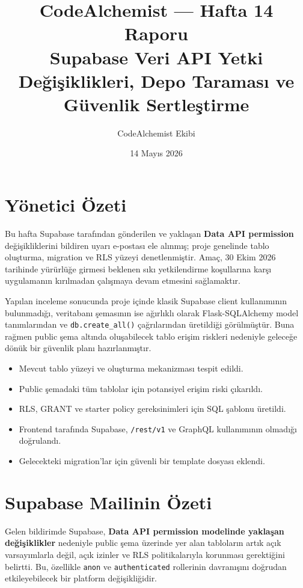 \documentclass[12pt,a4paper]{article}
\title{\textbf{CodeAlchemist --- Hafta 14 Raporu} \\[0.3em]
\large Supabase Veri API Yetki Değişiklikleri, Depo Taraması ve Güvenlik Sertleştirme}
\author{CodeAlchemist Ekibi}
\date{14 Mayıs 2026}
\begin{document}
\maketitle
\tableofcontents
\newpage

\section{Yönetici Özeti}

Bu hafta Supabase tarafından gönderilen ve yaklaşan \textbf{Data API permission} değişikliklerini bildiren uyarı e-postası ele alınmış; proje genelinde tablo oluşturma, migration ve RLS yüzeyi denetlenmiştir. Amaç, 30 Ekim 2026 tarihinde yürürlüğe girmesi beklenen sıkı yetkilendirme koşullarına karşı uygulamanın kırılmadan çalışmaya devam etmesini sağlamaktır.

Yapılan inceleme sonucunda proje içinde klasik Supabase client kullanımının bulunmadığı, veritabanı şemasının ise ağırlıklı olarak Flask-SQLAlchemy model tanımlarından ve \texttt{db.create\_all()} çağrılarından üretildiği görülmüştür. Buna rağmen public şema altında oluşabilecek tablo erişim riskleri nedeniyle geleceğe dönük bir güvenlik planı hazırlanmıştır.

\begin{itemize}[leftmargin=2em, itemsep=4pt]
	\item Mevcut tablo yüzeyi ve oluşturma mekanizması tespit edildi.
	\item Public şemadaki tüm tablolar için potansiyel erişim riski çıkarıldı.
	\item RLS, GRANT ve starter policy gereksinimleri için SQL şablonu üretildi.
	\item Frontend tarafında Supabase, \texttt{/rest/v1} ve GraphQL kullanımının olmadığı doğrulandı.
	\item Gelecekteki migration'lar için güvenli bir template dosyası eklendi.
\end{itemize}

\section{Supabase Mailinin Özeti}

Gelen bildirimde Supabase, \textbf{Data API permission modelinde yaklaşan değişiklikler} nedeniyle public şema üzerinde yer alan tabloların artık açık varsayımlarla değil, açık izinler ve RLS politikalarıyla korunması gerektiğini belirtti. Bu, özellikle \texttt{anon} ve \texttt{authenticated} rollerinin davranışını doğrudan etkileyebilecek bir platform değişikliğidir.
\end{document}
